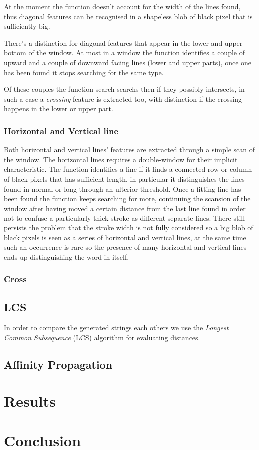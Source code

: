 \documentclass[a4paper,12pt]{article}
\begin{document}
At the moment the function doesn't account for the width of the lines found, thus diagonal features can be recognised in a shapeless blob of black pixel that is sufficiently big. 
   
There's a distinction for diagonal features that appear in the lower and upper bottom of the window.
At most in a window the function identifies a couple of upward and a couple of downward facing lines (lower and upper parts), once one has been found it stops searching for the same type.

Of these couples the function search searchs then if they possibly intersects, in such a case a \emph{crossing} feature is extracted too, with distinction if the crossing happens in the lower or upper part. 

\subsubsection{Horizontal and Vertical line}
Both horizontal and vertical lines' features are extracted through
a simple scan of the window.
The horizontal lines requires a double-window for their implicit characteristic.
The function identifies a line if it finds a connected row or column of black pixels that has sufficient length, in particular it distinguishes the lines found in normal or long through an ulterior threshold.
Once a fitting line has been found the function keeps searching for more, continuing the scansion of the window after having moved a certain distance from the last line found in order not to confuse a particularly thick stroke as different separate lines.
There still persists the problem that the stroke width is not fully considered so a big blob of black pixels is seen as a series of horizontal and vertical lines, at the same time such an occurrence is rare so the presence of many horizontal and vertical lines ends up distinguishing the word in itself.     

\subsubsection{Cross}  
  
\subsection{LCS} 

In order to compare the generated strings each others we use the \emph{Longest Common Subsequence} (LCS) algorithm for evaluating distances.

 
 
\subsection{Affinity Propagation}

\section{Results}

\section{Conclusion} 
\end{document}
